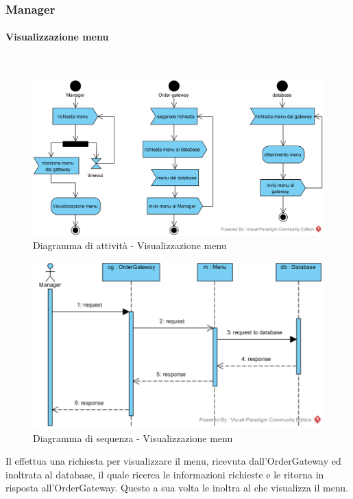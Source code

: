 \subsubsection{Manager}

\paragraph{Visualizzazione menu}\mbox{}\\
\nopagebreak
\begin{figure}[H]
	\centering
	\includegraphics[width=14cm]{diagrammi_img/attivita/manager_get_menu.png}
	\caption{Diagramma di attività - Visualizzazione menu}
\end{figure}

\begin{figure}[H]
	\centering
	\includegraphics[width=14cm]{../../documenti/SpecificaTecnica/diagrammi_img/sequenza/direttore_visualizza_menu.png}
	\caption{Diagramma di sequenza - Visualizzazione menu}
\end{figure}
Il \Manager{} effettua una richiesta per visualizzare il menu, ricevuta dall'Order\-Gateway ed inoltrata al database, il quale ricerca le informazioni richieste e le ritorna in risposta all'Order\-Gateway. Questo a sua volta le inoltra al \Manager{} che visualizza il menu.

